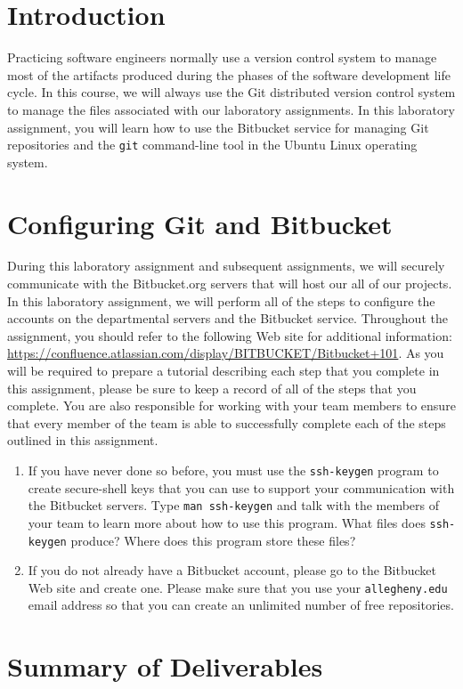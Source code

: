 

\usepackage[compact]{titlesec}



\section*{Introduction}

Practicing software engineers normally use a version control system to manage most of the artifacts produced during the
phases of the software development life cycle.  In this course, we will always use the Git distributed version control
system to manage the files associated with our laboratory assignments.  In this laboratory assignment, you will learn
how to use the Bitbucket service for managing Git repositories and the {\tt git} command-line tool in the Ubuntu Linux
operating system.

\section*{Configuring Git and Bitbucket}

During this laboratory assignment and subsequent assignments, we will securely communicate with the Bitbucket.org
servers that will host our all of our projects.  In this laboratory assignment, we will perform all of the steps to
configure the accounts on the departmental servers and the Bitbucket service.  Throughout the assignment, you should
refer to the following Web site for additional information:
\url{https://confluence.atlassian.com/display/BITBUCKET/Bitbucket+101}.  As you will be required to prepare a tutorial
describing each step that you complete in this assignment, please be sure to keep a record of all of the steps that you
complete.  You are also responsible for working with your team members to ensure that every member of the team is able
to successfully complete each of the steps outlined in this assignment.

\begin{enumerate}
	\item If you have never done so before, you must use the {\tt ssh-keygen} program to create secure-shell keys that
		you can use to support your communication with the Bitbucket servers.  Type {\tt man ssh-keygen} and talk with
		the members of your team to learn more about how to use this program.  What files does {\tt ssh-keygen} produce? 
		Where does this program store these files?

	\item If you do not already have a Bitbucket account, please go to the Bitbucket Web site and create one.  Please
		make sure that you use your {\tt allegheny.edu} email address so that you can create an unlimited number of free
		repositories.
\end{enumerate}

\section*{Summary of Deliverables}


